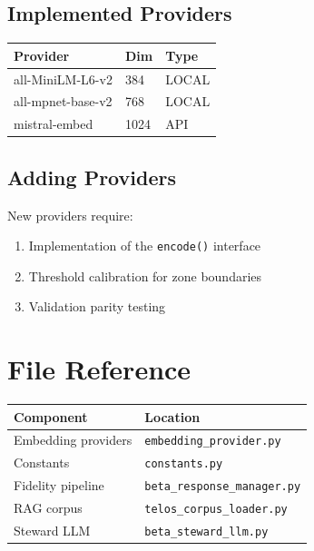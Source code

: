 \documentclass[11pt,twocolumn]{article}
\begin{document}
\subsection{Implemented Providers}

\vspace{0.5em}
\noindent
\begin{tabular}{@{}lll@{}}
\toprule
\textbf{Provider} & \textbf{Dim} & \textbf{Type} \\
\midrule
all-MiniLM-L6-v2 & 384 & LOCAL \\
all-mpnet-base-v2 & 768 & LOCAL \\
mistral-embed & 1024 & API \\
\bottomrule
\end{tabular}
\vspace{0.5em}

\subsection{Adding Providers}

New providers require:
\begin{enumerate}
    \item Implementation of the \texttt{encode()} interface
    \item Threshold calibration for zone boundaries
    \item Validation parity testing
\end{enumerate}

\section{File Reference}

\vspace{0.5em}
\noindent
\begin{tabular}{@{}lp{3.5cm}@{}}
\toprule
\textbf{Component} & \textbf{Location} \\
\midrule
Embedding providers & \texttt{embedding\_provider.py} \\
Constants & \texttt{constants.py} \\
Fidelity pipeline & \texttt{beta\_response\_manager.py} \\
RAG corpus & \texttt{telos\_corpus\_loader.py} \\
Steward LLM & \texttt{beta\_steward\_llm.py} \\
\bottomrule
\end{tabular}
\vspace{0.5em}
\end{document}

